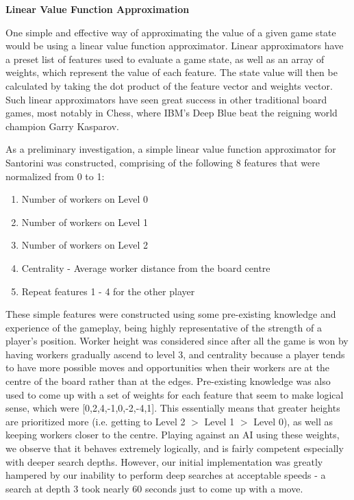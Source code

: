 \documentclass[a4paper,12pt,table]{article}
\begin{document}
\vspace{1.5cm}
\textbf{Linear Value Function Approximation}
\newline

One simple and effective way of approximating the value of a given game state would be using a linear value function approximator. \cite{Reinforcement learning: An introduction} Linear approximators have a preset list of features used to evaluate a game state, as well as an array of weights, which represent the value of each feature. The state value will then be calculated by taking the dot product of the feature vector and weights vector. Such linear approximators have seen great success in other traditional board games, most notably in Chess, where IBM’s Deep Blue beat the reigning world champion Garry Kasparov. \cite{Deep Blue} \par

As a preliminary investigation, a simple linear value function approximator for Santorini was constructed, comprising of the following 8 features that were normalized from 0 to 1:
\begin{enumerate}
    \item Number of workers on Level 0
    \item Number of workers on Level 1
    \item Number of workers on Level 2
    \item Centrality - Average worker distance from the board centre
    \item Repeat features 1 - 4 for the other player
\end{enumerate}

These simple features were constructed using some pre-existing knowledge and experience of the gameplay, being highly representative of the strength of a player’s position. Worker height was considered since after all the game is won by having workers gradually ascend to level 3, and centrality because a player tends to have more possible moves and opportunities when their workers are at the centre of the board rather than at the edges. Pre-existing knowledge was also used to come up with a set of weights for each feature that seem to make logical sense, which were [0,2,4,-1,0,-2,-4,1]. This essentially means that greater heights are prioritized more (i.e. getting to Level 2 $>$ Level 1 $>$ Level 0), as well as keeping workers closer to the centre. Playing against an AI using these weights, we observe that it behaves extremely logically, and is fairly competent especially with deeper search depths. However, our initial implementation was greatly hampered by our inability to perform deep searches at acceptable speeds - a search at depth 3 took nearly 60 seconds just to come up with a move. \par
\end{document}
